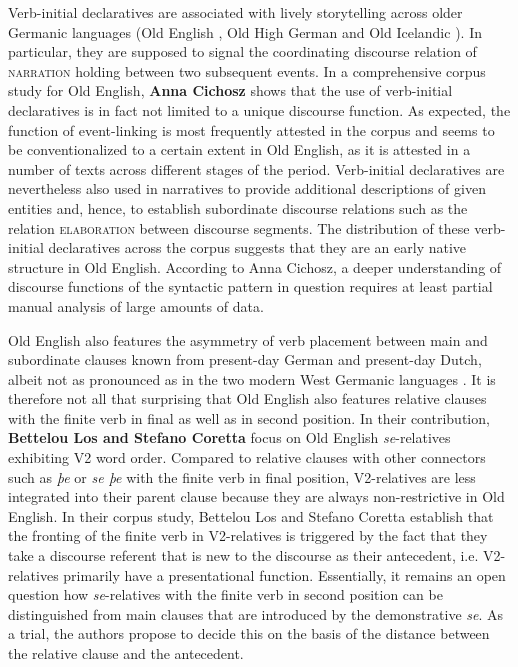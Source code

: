 \documentclass[output=paper,colorlinks,citecolor=brown]{langscibook}
\begin{document}
\bigskip
Verb-initial declaratives are associated with lively storytelling across older Germanic languages (Old English \citealt {Los2000}, Old High German \citealt{hinterholzl2010v1} and Old Icelandic \citealt{booth-beck20200jhs}). In particular, they are supposed to signal the coordinating discourse relation of \textsc{narration} holding between two subsequent events. In a comprehensive corpus study for Old English, \textbf{Anna Cichosz} shows that the use of verb-initial declaratives is in fact not limited to a unique discourse function. As expected, the function of event-linking is most frequently attested in the corpus and seems to be conventionalized to a certain extent in Old English, as it is attested in a number of texts across different stages of the period. Verb-initial declaratives are nevertheless also used in narratives to provide additional descriptions of given entities and, hence, to establish subordinate discourse relations such as the relation \textsc{elaboration} between discourse segments. The distribution of these verb-initial declaratives across the corpus suggests that they are an early native structure in Old English. According to Anna Cichosz, a deeper understanding of discourse functions of the syntactic pattern in question requires at least partial manual analysis of large amounts of data.   

\bigskip
\noindent
Old English also features the asymmetry of verb placement between main and subordinate clauses known from present-day German and present-day Dutch, albeit not as pronounced as in the two modern West Germanic languages \parencite{Pintzuk1999}. It is therefore not all that surprising that Old English also features relative clauses with the finite verb in final as well as in second position. In their contribution, \textbf{Bettelou Los and Stefano Coretta} focus on Old English \textit{se}-relatives exhibiting V2 word order. Compared to relative clauses with other connectors such as \textit{þe} or \textit{se þe} with the finite verb in final position, V2-relatives are less integrated into their parent clause because they are always non-restrictive in Old English. In their corpus study, Bettelou Los and Stefano Coretta establish that the fronting of the finite verb in V2-relatives is triggered by the fact that they take a discourse referent that is new to the discourse as their antecedent, i.e. V2-relatives primarily have a presentational function. Essentially, it remains an open question how \textit{se}-relatives with the finite verb in second position can be distinguished from main clauses that are introduced by the demonstrative \textit{se}. As a trial, the authors propose to decide this on the basis of the distance between the relative clause and the antecedent.   
\end{document}
